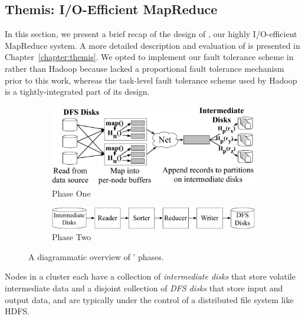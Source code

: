 \subsection{Themis: I/O-Efficient MapReduce}
\label{sec:themis}

In this section, we present a brief recap of the design of \themis, our highly
I/O-efficient MapReduce system. A more detailed description and evaluation of
\themis is presented in Chapter~\ref{chapter:themis}.  We opted to implement
our fault tolerance scheme in \themis rather than Hadoop because \themis lacked
a proportional fault tolerance mechanism prior to this work, whereas the
task-level fault tolerance scheme used by Hadoop is a tightly-integrated part
of its design.

\begin{figure}
  \centering
  \begin{subfigure}[t]{\columnwidth}
  \centering
  \includegraphics[width=\columnwidth]{fault_tolerance/figures/detailed_phase_one.pdf}
  \caption{\label{fig:phase_one} Phase One}
  \end{subfigure}\vspace{1em}
  \begin{subfigure}[t]{\columnwidth}
  \centering
  \includegraphics[width=\columnwidth]{fault_tolerance/figures/phase_two.pdf}
  \caption{\label{fig:phase_two} Phase Two}
  \end{subfigure}

  \caption{\label{fig:themis_phases} A diagrammatic overview of \themis' phases.}
\end{figure}

Nodes in a \themis cluster each have a collection of \emph{intermediate disks}
that store volatile intermediate data and a disjoint collection of \emph{DFS
  disks} that store input and output data, and are typically under the control
of a distributed file system like HDFS.


